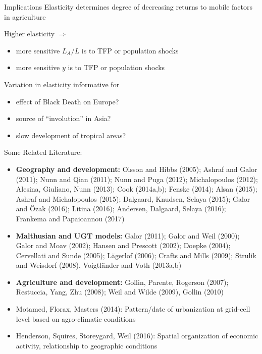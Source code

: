 \documentclass[10pt, xcolor=dvipsnames]{beamer}
\begin{document}
\begin{frame}{Implications}
Elasticity determines degree of decreasing returns to mobile factors in agriculture

\vspace{.2cm} Higher elasticity $\Rightarrow$
\begin{itemize}
  \item more sensitive $L_A/L$ is to TFP or population shocks
  \item more sensitive $y$ is to TFP or population shocks
\end{itemize}

\vspace{.2cm} Variation in elasticity informative for
\begin{itemize}
  \item effect of Black Death on Europe? 
  \item source of ``involution'' in Asia?
  \item slow development of tropical areas?
\end{itemize}

\end{frame}

\begin{frame}{Some Related Literature:}
\begin{itemize}
  \item \textbf{Geography and development:} Olsson and Hibbs (2005); Ashraf and Galor (2011); Nunn and Qian (2011); Nunn and Puga (2012); Michalopoulos (2012); Alesina, Giuliano, Nunn (2013); Cook (2014a,b); Fenske (2014); Alsan (2015); Ashraf and Michalopoulos (2015); Dalgaard, Knudsen, Selaya (2015); Galor and {\"O}zak (2016); Litina (2016); Andersen, Dalgaard, Selaya (2016); Frankema and Papaioannou (2017)
  \item \textbf{Malthusian and UGT models:} Galor (2011); Galor and Weil (2000); Galor and Moav (2002); Hansen and Prescott (2002); Doepke (2004); Cervellati and Sunde (2005); L{\"a}gerlof (2006); Crafts and Mills (2009); Strulik and Weisdorf (2008), Voigtl{\"a}nder and Voth (2013a,b)
  \item \textbf{Agriculture and development:} Gollin, Parente, Rogerson (2007); Restuccia, Yang, Zhu (2008); Weil and Wilde (2009), Gollin (2010)
  \item Motamed, Florax, Masters (2014): Pattern/date of urbanization at grid-cell level based on agro-climatic conditions
  \item Henderson, Squires, Storeygard, Weil (2016): Spatial organization of economic activity, relationship to geographic conditions
\end{itemize}

\end{frame}
\end{document}
